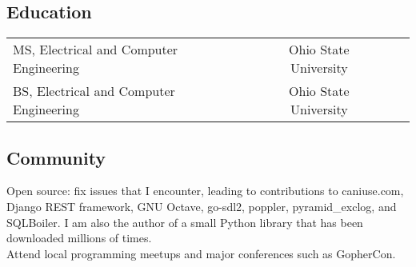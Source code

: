 \documentclass[12pt]{report}
\makeatletter
\renewcommand{\bullet}{$\vcenter{\hbox{~\huge$\cdot$~}}$}
\newenvironment{bullets}
{\tabularx{\textwidth}{ @{\bullet} X @{} }}
{\endtabularx}
\makeatother
\begin{document}
\subsection*{Education}
\begin{tabularx}{\textwidth}{ @{\bullet} l X c X r @{} }
MS, Electrical and Computer Engineering && Ohio State University \\
BS, Electrical and Computer Engineering && Ohio State University \\
\end{tabularx}

\subsection*{Community}
\begin{bullets}
Open source: fix issues that I encounter, leading to contributions to
	caniuse.com,
	Django REST framework,
	GNU Octave,
	go-sdl2,
	poppler,
	pyramid\_exclog,
	and
	SQLBoiler.
I am also the author of a small Python library that has been downloaded millions of times. \\
Attend local programming meetups and major conferences such as GopherCon. \\
\end{bullets}
\end{document}
